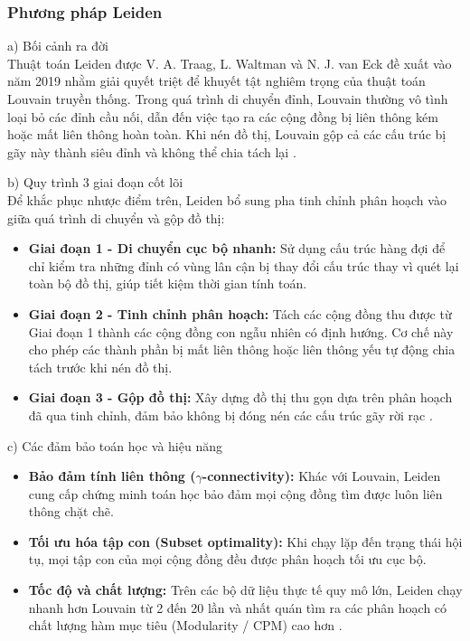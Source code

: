 \documentclass[14pt,a4paper]{extarticle}
\begin{document}
\subsubsection{Phương pháp Leiden}

\noindent a) Bối cảnh ra đời
\\ \indent
Thuật toán Leiden được V. A. Traag, L. Waltman và N. J. van Eck đề xuất vào năm 2019 nhằm giải quyết triệt để khuyết tật nghiêm trọng của thuật toán Louvain truyền thống. Trong quá trình di chuyển đỉnh, Louvain thường vô tình loại bỏ các đỉnh cầu nối, dẫn đến việc tạo ra các cộng đồng bị liên thông kém hoặc mất liên thông hoàn toàn. Khi nén đồ thị, Louvain gộp cả các cấu trúc bị gãy này thành siêu đỉnh và không thể chia tách lại \cite{Traag2019}.

\noindent b) Quy trình 3 giai đoạn cốt lõi
\\ \indent
Để khắc phục nhược điểm trên, Leiden bổ sung pha tinh chỉnh phân hoạch vào giữa quá trình di chuyển và gộp đồ thị:
\begin{itemize}
    \item \textbf{Giai đoạn 1 - Di chuyển cục bộ nhanh:} Sử dụng cấu trúc hàng đợi để chỉ kiểm tra những đỉnh có vùng lân cận bị thay đổi cấu trúc thay vì quét lại toàn bộ đồ thị, giúp tiết kiệm thời gian tính toán.
    \item \textbf{Giai đoạn 2 - Tinh chỉnh phân hoạch:} Tách các cộng đồng thu được từ Giai đoạn 1 thành các cộng đồng con ngẫu nhiên có định hướng. Cơ chế này cho phép các thành phần bị mất liên thông hoặc liên thông yếu tự động chia tách trước khi nén đồ thị.
    \item \textbf{Giai đoạn 3 - Gộp đồ thị:} Xây dựng đồ thị thu gọn dựa trên phân hoạch đã qua tinh chỉnh, đảm bảo không bị đóng nén các cấu trúc gãy rời rạc \cite{Traag2019}.
\end{itemize}

\noindent c) Các đảm bảo toán học và hiệu năng
\begin{itemize}
    \item \textbf{Bảo đảm tính liên thông ($\gamma$-connectivity):} Khác với Louvain, Leiden cung cấp chứng minh toán học bảo đảm mọi cộng đồng tìm được luôn liên thông chặt chẽ.
    \item \textbf{Tối ưu hóa tập con (Subset optimality):} Khi chạy lặp đến trạng thái hội tụ, mọi tập con của mọi cộng đồng đều được phân hoạch tối ưu cục bộ.
    \item \textbf{Tốc độ và chất lượng:} Trên các bộ dữ liệu thực tế quy mô lớn, Leiden chạy nhanh hơn Louvain từ 2 đến 20 lần và nhất quán tìm ra các phân hoạch có chất lượng hàm mục tiêu (Modularity / CPM) cao hơn \cite{Traag2019}.
\end{itemize}
\end{document}
